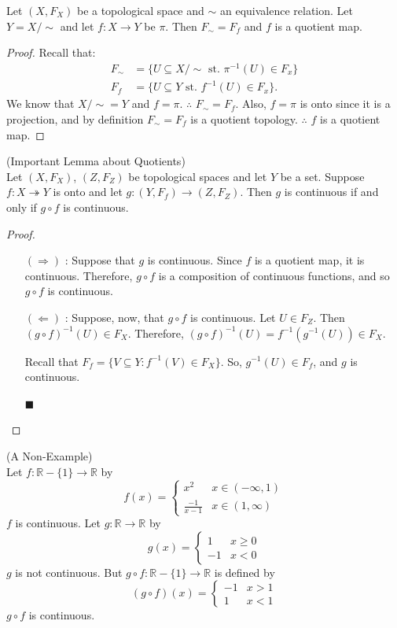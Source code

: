 \begin{theorem}
	Let $(X,F_X)$ be a topological space and $\sim$ an equivalence relation. Let $Y = X/\sim$ and let $f : X \rightarrow Y$ be $\pi$. Then $F_\sim = F_f$ and $f$ is a quotient map. 
\end{theorem}
\begin{proof}
	Recall that: 
	\begin{align*}
		F_\sim &= \{ U \subseteq X/\sim \text{ st. } \pi^{-1} (U) \in F_x \} \\
		F_f &= \{ U \subseteq Y \text{ st. } f^{-1} (U) \in F_x \}. 
	\end{align*}
	We know that $X/\sim = Y$ and $f = \pi$. $\therefore$ $F_\sim = F_f$. Also, $f = \pi$ is onto since it is a projection, and by definition $F_\sim = F_f$ is a quotient topology. $\therefore$ $f$ is a quotient map. 
\end{proof}
\begin{lemma}
	(Important Lemma about Quotients)\\
	Let $(X,F_X)$, $(Z,F_Z)$ be topological spaces and let $Y$ be a set. Suppose $f: X \twoheadrightarrow Y$ is onto and let $g: (Y,F_f) \rightarrow (Z,F_Z)$. Then $g$ is continuous if and only if $g \circ f$ is continuous. 
\end{lemma}
\begin{proof}
	\begin{itemize}
		\item[$(\Rightarrow)$]: Suppose that $g$ is continuous. Since $f$ is a quotient map, it is continuous. Therefore, $g\circ f$ is a composition of continuous functions, and so $g\circ f$ is continuous.
		
		\item[$(\Leftarrow)$]: Suppose, now, that $g\circ f$ is continuous. Let $U\in F_Z$. Then $(g\circ f)^{-1}(U)\in F_X$. Therefore, $(g\circ f)^{-1}(U) = f^{-1}(g^{-1}(U)) \in F_X$.
		
		Recall that $F_f = \{ V\subseteq Y : f^{-1}(V)\in F_X\}$. So, $g^{-1}(U) \in F_f$, and $g$ is continuous. 
		\begin{flushright}
			$\blacksquare$ 
		\end{flushright}
	\end{itemize}
\end{proof}
\begin{example}
	(A Non-Example)\\
	Let $f: \mathbb{R}-\{1\} \rightarrow \mathbb{R}$ by
	\[ f(x) = 
	\begin{cases}
		x^2 & x\in(-\infty, 1) \\
		\frac{-1}{x-1} & x\in (1, \infty) 
	\end{cases}
	\]
	$f$ is continuous. Let $g: \mathbb{R} \rightarrow \mathbb{R}$ by
	\[ g(x) = 
	\begin{cases}
		1 & x\ge 0 \\
		-1 & x < 0 
	\end{cases}
	\]
	$g$ is not continuous. But $g \circ f: \mathbb{R}-\{1\} \rightarrow \mathbb{R}$ is defined by
	\[ (g\circ f)(x) = 
	\begin{cases}
		-1 & x > 1 \\
		1 & x < 1 
	\end{cases}
	\]
	$g \circ f$ is continuous. 
\end{example}
